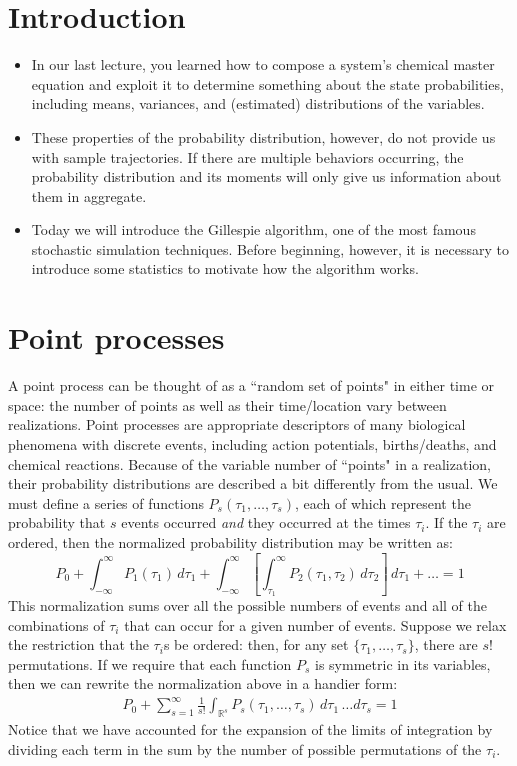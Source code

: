 \documentclass{article}
\begin{document}
\large

\section*{Introduction}
\begin{itemize}
\item In our last lecture, you learned how to compose a system's chemical master equation and exploit it to determine something about the state probabilities, including means, variances, and (estimated) distributions of the variables.
\item These properties of the probability distribution, however, do not provide us with sample trajectories. If there are multiple behaviors occurring, the probability distribution and its moments will only give us information about them in aggregate.
\item Today we will introduce the Gillespie algorithm, one of the most famous stochastic simulation techniques. Before beginning, however, it is necessary to introduce some statistics to motivate how the algorithm works.
\end{itemize}

\section*{Point processes}
A point process can be thought of as a ``random set of points" in either time or space: the number of points as well as their time/location vary between realizations. Point processes are appropriate descriptors of many biological phenomena with discrete events, including action potentials, births/deaths, and chemical reactions. Because of the variable number of ``points" in a realization, their probability distributions are described a bit differently from the usual. We must define a series of functions $P_s(\tau_1, \ldots, \tau_s)$, each of which represent the probability that $s$ events occurred \textit{and} they occurred at the times $\tau_i$. If the $\tau_i$ are ordered, then the normalized probability distribution may be written as:
\[ P_0 + \int_{-\infty}^{\infty} P_1(\tau_1) \, d\tau_1 +  \int_{-\infty}^{\infty}  \left[ \int_{\tau_1}^{\infty} P_2(\tau_1,\tau_2) \, d\tau_2 \right] \, d\tau_1 + \ldots = 1 \]
This normalization sums over all the possible numbers of events and all of the combinations of $\tau_i$ that can occur for a given number of events. Suppose we relax the restriction that the $\tau_i$s be ordered: then, for any set $\{ \tau_1, \ldots, \tau_s\}$, there are $s!$ permutations. If we require that each function $P_s$ is symmetric in its variables, then we can rewrite the normalization above in a handier form:
\begin{eqnarray}
P_0 + \sum_{s=1}^{\infty} \frac{1}{s!} \int_{\mathbb{R}^{s}} P_s(\tau_1,\ldots,\tau_s) \, d\tau_1 \, \ldots d\tau_s = 1 \label{eqn:normpoint}
\end{eqnarray}
Notice that we have accounted for the expansion of the limits of integration by dividing each term in the sum by the number of possible permutations of the $\tau_i$.\\
\end{document}
